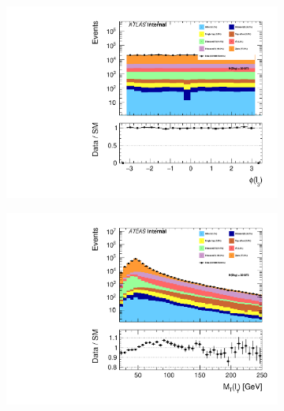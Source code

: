 \begin{figure}
{\begin{subfigure}{.425\textwidth}
        \includegraphics[width=\textwidth]{Figures/FeaturesHistograms/lep3_Phi.pdf}
        \caption{}
        \label{fig:lep3_Phi}
    \end{subfigure}
    \hfill
    \begin{subfigure}{.425\textwidth}
        \includegraphics[width=\textwidth]{Figures/FeaturesHistograms/lep1_Mt.pdf}
        \caption{}
        \label{fig:lep1_Mt}
    \end{subfigure}
    }
\end{figure}
